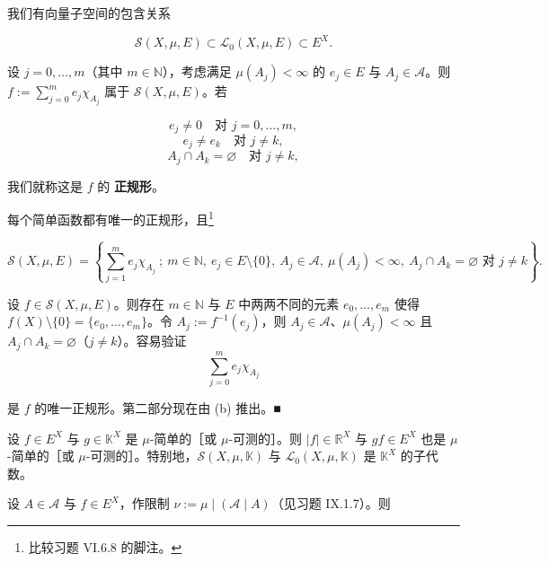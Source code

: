 \begin{remark}

\begin{items}
\item

我们有向量子空间的包含关系

\[
\mathcal{S}(X,\mu,E) \subset \mathcal{L}_0(X,\mu,E) \subset E^X .
\]
\item

设 $ j = 0,\ldots,m $（其中 $ m \in \mathbb{N} $），考虑满足 $ \mu(A_j) < \infty $ 的 $ e_j \in E $ 与 $ A_j \in \mathcal{A} $。则 $ f := \sum_{j=0}^{m} e_j \chi_{A_j} $ 属于 $ \mathcal{S}(X,\mu,E) $。若

\[
e_j \neq 0 \quad \text{对 } j = 0,\ldots,m ,
\]
\[
e_j \neq e_k \quad \text{对 } j \neq k ,
\]
\[
A_j \cap A_k = \varnothing \quad \text{对 } j \neq k ,
\]

我们就称这是 $ f $ 的 \textbf{正规形}。

\item

每个简单函数都有唯一的正规形，且\footnote{比较习题 VI.6.8 的脚注。}

\[
\mathcal{S}(X,\mu,E) = \left\{ \sum_{j=1}^{m} e_j \chi_{A_j} \ ;\ m \in \mathbb{N},\ e_j \in E \setminus \{0\},\ A_j \in \mathcal{A},\ \mu(A_j) < \infty,\ A_j \cap A_k = \varnothing \text{ 对 } j \neq k \right\} .
\]

\proofhead
设 $ f \in \mathcal{S}(X,\mu,E) $。则存在 $ m \in \mathbb{N} $ 与 $ E $ 中两两不同的元素 $ e_0,\ldots,e_m $ 使得 $ f(X) \setminus \{0\} = \{e_0,\ldots,e_m\} $。令 $ A_j := f^{-1}(e_j) $，则 $ A_j \in \mathcal{A} $、$ \mu(A_j) < \infty $ 且 $ A_j \cap A_k = \varnothing $（$ j \neq k $）。容易验证
\[
\sum_{j=0}^{m} e_j \chi_{A_j}
\]

是 $ f $ 的唯一正规形。第二部分现在由 (b) 推出。\nobreak\hspace{0.35em}■

\item

设 $ f \in E^X $ 与 $ g \in \mathbb{K}^X $ 是 $ \mu $-简单的［或 $ \mu $-可测的］。则 $ |f| \in \mathbb{R}^X $ 与 $ gf \in E^X $ 也是 $ \mu $-简单的［或 $ \mu $-可测的］。特别地，$ \mathcal{S}(X,\mu,\mathbb{K}) $ 与 $ \mathcal{L}_0(X,\mu,\mathbb{K}) $ 是 $ \mathbb{K}^X $ 的子代数。

\item

设 $ A \in \mathcal{A} $ 与 $ f \in E^X $，作限制 $ \nu := \mu \mid (\mathcal{A} \mid A) $（见习题 IX.1.7）。则


\end{items}
\end{remark}
